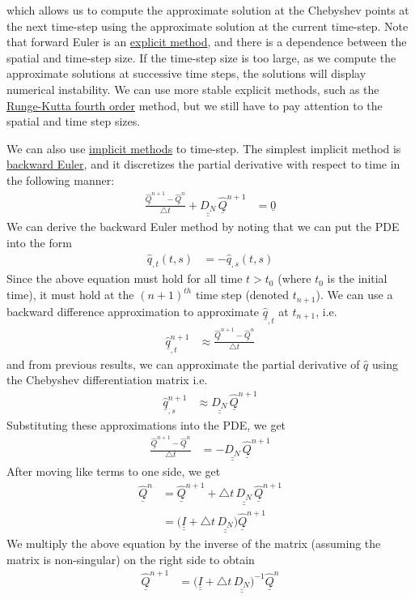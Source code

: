 \documentclass[12pt]{article}
\newcommand{\bunderline}[1]{\underline{#1}}
\renewcommand{\vec}[1]{{\bunderline{#1}}}
\newcommand{\mat}[1]{{\bunderline{\bunderline{#1}}}}
\begin{document}
which allows us to compute the approximate solution at the Chebyshev points at the next time-step using the approximate solution at the current time-step.
Note that forward Euler is an \underline{explicit method}, and there is a dependence between the spatial and time-step size. 
If the time-step size is too large, as we compute the approximate solutions at successive time steps, the solutions will display numerical instability. 
We can use more stable explicit methods, such as the \underline{Runge-Kutta fourth order} method, but we still have to pay attention to the spatial and time step sizes.
\par 
We can also use \underline{implicit methods} to time-step.
The simplest implicit method is \underline{backward Euler}, and it discretizes the partial derivative with respect to time in the following manner:
\begin{align*}
	\frac{\hat{\vec{Q}}^{n+1} - \hat{\vec{Q}}^{n}}{\triangle t} + \mat{D_{N}} \, \hat{\vec{Q}}^{n+1} & = \vec{0}
\end{align*}
We can derive the backward Euler method by noting that we can put the PDE into the form
\begin{align*}
	\hat{q}_{, t}(t, s) & = -\hat{q}_{, s}(t, s)
\end{align*}
Since the above equation must hold for all time $t > t_{0}$ (where $t_0$ is the initial time), it must hold at the $(n+1)^{th}$ time step (denoted $t_{n+1}$).
We can use a backward difference approximation to approximate $\underline{\hat{q}}_{, t}$ at $t_{n+1}$, i.e.
\begin{align*}
	\vec{\hat{q}}_{, t}^{n+1} & \approx \frac{\hat{\vec{Q}}^{n+1} - \hat{\vec{Q}}^{n}}{\triangle t}
\end{align*}
and from previous results, we can approximate the partial derivative of $\hat{q}$ using the Chebyshev differentiation matrix i.e.
\begin{align*}
	\vec{\hat{q}}_{, s}^{n+1} & \approx \mat{D_{N}} \, \vec{\hat{Q}}^{n+1} 
\end{align*}
Substituting these approximations into the PDE, we get
\begin{align*}
	\frac{\hat{\vec{Q}}^{n+1} - \hat{\vec{Q}}^{n}}{\triangle t} & = -\mat{D_{N}} \, \vec{\hat{Q}}^{n+1} 
\end{align*}
After moving like terms to one side, we get
\begin{align*}
	\hat{\vec{Q}}^{n} & = \hat{\vec{Q}}^{n+1} + \triangle t \, \mat{D_{N}} \, \vec{\hat{Q}}^{n+1} \\
					  & = \Big( \mat{I} +  \triangle t \, \mat{D_{N}} \Big) \hat{\vec{Q}}^{n+1}
\end{align*}
We multiply the above equation by the inverse of the matrix (assuming the matrix is non-singular) on the right side to obtain
\begin{align*}
	\hat{\vec{Q}}^{n+1} & = \Big( \mat{I} +  \triangle t \, \mat{D_{N}} \Big)^{-1} \hat{\vec{Q}}^{n}
\end{align*}
\end{document}
